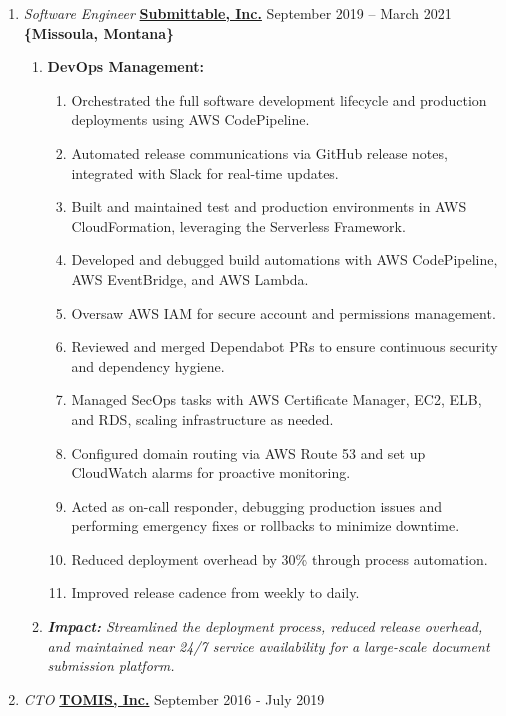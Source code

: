 \documentclass[oneside]{article}%
\begin{document}
\begin{enumerate}[]
	\item \textit{Software Engineer} \textbf{\href{https://submittable.com}{Submittable, Inc.}} \hfill September 2019 -- March 2021\\
		\textbf{\{Missoula, Montana\}}
		\begin{enumerate}[]
			\item \textbf{DevOps Management:}
		          	\begin{enumerate}[-]
		     	          	\item Orchestrated the full software development lifecycle and production deployments using AWS CodePipeline.
				          \item Automated release communications via GitHub release notes, integrated with Slack for real-time updates.
			      		\item Built and maintained test and production environments in AWS CloudFormation, leveraging the Serverless Framework.
			      		\item Developed and debugged build automations with AWS CodePipeline, AWS EventBridge, and AWS Lambda.
		 	      		\item Oversaw AWS IAM for secure account and permissions management.
			      		\item Reviewed and merged Dependabot PRs to ensure continuous security and dependency hygiene.
			      		\item Managed SecOps tasks with AWS Certificate Manager, EC2, ELB, and RDS, scaling infrastructure as needed.
			         		\item Configured domain routing via AWS Route 53 and set up CloudWatch alarms for proactive monitoring.
			      		\item Acted as on-call responder, debugging production issues and performing emergency fixes or rollbacks to minimize downtime.
					\item Reduced deployment overhead by 30\% through process automation.
					\item Improved release cadence from weekly to daily.
			    	\end{enumerate}
			\item \textit{\textbf{Impact:} Streamlined the deployment process, reduced release overhead, and maintained near 24/7 service availability for a large-scale document submission platform.}  %
		\end{enumerate}
	\item \textit{CTO} \textbf{\href{https://tomis.tech}{TOMIS, Inc.}} \hfill September 2016 - July 2019\\

\end{enumerate}
\end{document}
